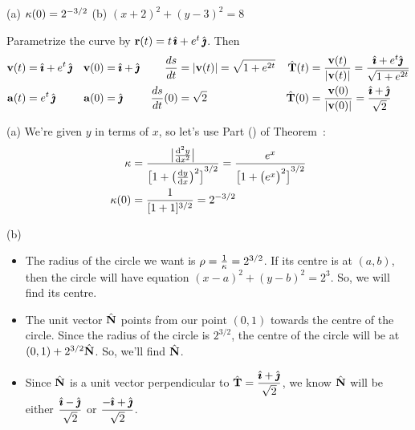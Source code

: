 
\begin{answer} 
(a) $\kappa(0)=2^{-3/2}$ \qquad
(b) $(x+2)^2+(y-3)^2=8$
\end{answer}

\begin{solution} 
Parametrize the curve by $\mathbf{r}(t) = t\,\hat{\pmb{\imath}} +e^t\,\hat{\pmb{\jmath}}$. Then
\begin{align*}
\mathbf{v}(t) & = \hat{\pmb{\imath}} + e^t\,\hat{\pmb{\jmath}}  &
\mathbf{v}(0) & = \hat{\pmb{\imath}} +\hat{\pmb{\jmath}} &
\frac{ds}{dt} &=|\mathbf{v}(t)|=\sqrt{1+e^{2t}} &
\hat{\mathbf{T}}(t) & = \frac{\mathbf{v}(t)}{|\mathbf{v}(t)|} = \frac{\hat{\pmb{\imath}}+e^t\hat{\pmb{\jmath}}}{\sqrt{1+e^{2t}}}\\
\mathbf{a}(t) & =  e^t\,\hat{\pmb{\jmath}}  &
\mathbf{a}(0) & = \hat{\pmb{\jmath}} \ &
\frac{ds}{dt}(0) &=\sqrt{2} &
\hat{\mathbf{T}}(0) & = \frac{\mathbf{v}(0)}{|\mathbf{v}(0)|} = \frac{\hat{\pmb{\imath}}+\hat{\pmb{\jmath}}}{\sqrt{2}}
\end{align*}

(a) We're given $y$ in terms of $x$, so let's use
 Part () of Theorem~:
 \begin{align*}
 \ka 
&=\frac{\big|\difftwo{y}{x}\big|}
{ {\big[1+\big(\diff{y}{x}\big)^2\big]}^{3/2} } = 
\frac{e^x}
{ {\big[1+\big(e^x\big)^2\big]}^{3/2} } \\
\ka(0)&=\frac{1}{[1+1]^{3/2}}=2^{-3/2}
 \end{align*}




(b)
\begin{itemize}
\item  The radius of the circle we want is $\rho=\frac{1}{\kappa}=2^{3/2}$. If its centre is at $(a,b)$, then the circle will have equation $(x-a)^2+(y-b)^2=2^3$. So, we will find its centre.

\item The unit vector $\hat{\mathbf{N}}$ points from our point $(0,1)$ towards the centre of the circle. Since the radius of the circle is $2^{3/2}$, the centre of the circle will be at $(0,1)+2^{3/2}\hat{\mathbf{N}}$. So, we'll find $\hat{\mathbf{N}}$.

\item Since $\hat{\mathbf{N}}$ is a unit vector perpendicular to $\hat{\mathbf{T}}=\dfrac{\hat{\pmb{\imath}}+\hat{\pmb{\jmath}}}{\sqrt 2}$, we know $\hat{\mathbf{N}}$ will be either $\dfrac{\hat{\pmb{\imath}}-\hat{\pmb{\jmath}}}{\sqrt 2}$ or $\dfrac{-\hat{\pmb{\imath}}+\hat{\pmb{\jmath}}}{\sqrt 2}$.


\end{itemize}
\end{solution}

